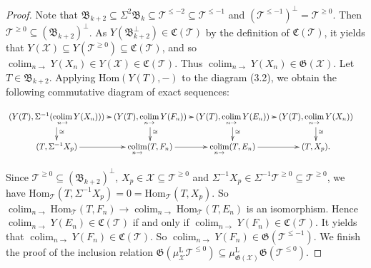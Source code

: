 \documentclass[11pt,a4paper]{amsart}
\numberwithin{equation}{section} \theoremstyle{plain}
\numberwithin{equation}{section} \theoremstyle{definition}
\begin{document}
\begin{proof}
Note that $\mathfrak{B}_{k+2}\subseteq\Sigma^{2}\mathfrak{B}_{k}\subseteq\mathcal{T}^{\leq-2}\subseteq\mathcal{T}^{\leq-1}$ and $(\mathcal{T}^{\leq-1})^{\perp}=\mathcal{T}^{\geq0}$. Then $\mathcal{T}^{\geq0}\subseteq(\mathfrak{B}_{k+2})^{\perp}$. As $Y(\mathfrak{B}_{k+2}^{\perp})\in\mathfrak{C}(\mathcal{T})$ by the definition of $\mathfrak{C}(\mathcal{T})$, it yields that $Y(\mathcal{X})\subseteq Y(\mathcal{T}^{\geq0})\subseteq\mathfrak{C}(\mathcal{T})$, and so $\displaystyle\operatorname*{colim}_{n\to}Y(X_{n})\in Y(\mathcal{X})\in \mathfrak{C}(\mathcal{T})$. Thus $\displaystyle\operatorname*{colim}_{n\to}Y(X_{n})\in \mathfrak{G}(\mathcal{X})$. Let $T\in\mathfrak{B}_{k+2}$. Applying $\mathrm{Hom}(Y(T),-)$ to the diagram (3.2), we obtain the following commutative diagram of exact sequences:\begin{center} $\xymatrix@C=5pt@R=15pt{
(Y(T),\Sigma^{-1}(\displaystyle\operatorname*{colim}_{n\to}Y(X_{n})))\ar[d]^{\cong}\ar[r]^{}&(Y(T),\displaystyle\operatorname*{colim}_{n\to}Y(F_{n}))\ar[d]^{\cong}\ar[r]^{} &(Y(T),\displaystyle\operatorname*{colim}_{n\to}Y(E_{n}))\ar[d]^{\cong}\ar[r]^{}&(Y(T),\displaystyle\operatorname*{colim}_{n\to}Y(X_{n}))\ar[d]^{\cong} &\\
(T,\Sigma^{-1}X_{p})\ar[r]^{}& \displaystyle\operatorname*{colim}_{n\to}(T,F_{n})\ar[r]^{}&\displaystyle\operatorname*{colim}_{n\to}(T,E_{n})\ar[r]^{}&(T,X_{p}).&}$
\end{center}
Since $\mathcal{T}^{\geq0}\subseteq(\mathfrak{B}_{k+2})^{\perp}$, $X_{p}\in\mathcal{X}\subseteq\mathcal{T}^{\geq0}$ and $\Sigma^{-1}X_{p}\in\Sigma^{-1}\mathcal{T}^{\geq0}\subseteq\mathcal{T}^{\geq0}$, we have  $\mathrm{Hom}_{\mathcal{T}}(T,\Sigma^{-1}X_{p})=0=\mathrm{Hom}_{\mathcal{T}}(T,X_{p})$. So $\displaystyle\operatorname*{colim}_{n\to}\mathrm{Hom}_{\mathcal{T}}(T,F_{n})\rightarrow\displaystyle\operatorname*{colim}_{n\to}\mathrm{Hom}_{\mathcal{T}}(T,E_{n})$ is an isomorphism. Hence $\displaystyle\operatorname*{colim}_{n\to}Y(E_{n})\in\mathfrak{C}(\mathcal{T})$ if and only if $\displaystyle\operatorname*{colim}_{n\to}Y(F_{n})\in\mathfrak{C}(\mathcal{T})$. It yields that $\displaystyle\operatorname*{colim}_{n\to}Y(F_{n})\in \mathfrak{C}(\mathcal{T})$. So $\displaystyle\operatorname*{colim}_{n\to}Y(F_{n})\in \mathfrak{G}(\mathcal{T}^{\leq-1})$. We finish the proof of the inclusion relation $\mathfrak{G}(\mu^{\mathrm{L}}_{\mathcal{X}}\mathcal{T}^{\leq0})\subseteq\mu^{\mathrm{L}}_{\mathfrak{G}(\mathcal{X})}\mathfrak{G}(\mathcal{T}^{\leq0})$.


\end{proof}
\end{document}
